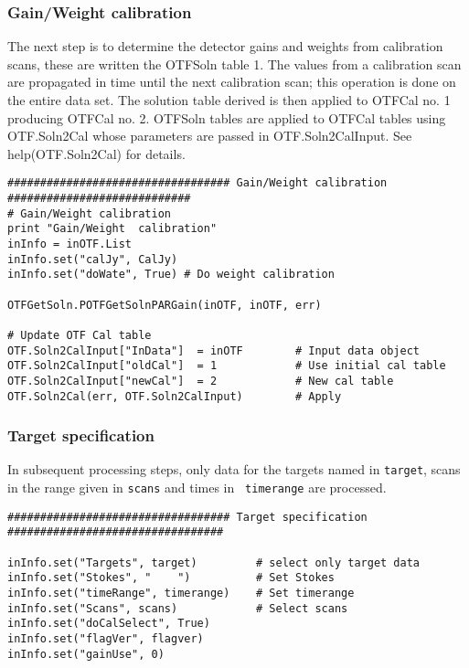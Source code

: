 \documentclass[11pt]{report}
\begin{document}
\subsubsection{Gain/Weight calibration}
The next step is to determine the detector gains and weights from
calibration scans, these are written the OTFSoln table 1.
The values from a calibration scan are propagated in time until the
next calibration scan;  this operation is done on the entire data set.
The solution table derived is then applied to OTFCal no. 1 producing
OTFCal no. 2.
OTFSoln tables are applied to OTFCal tables using OTF.Soln2Cal whose
parameters are passed in OTF.Soln2CalInput.
See help(OTF.Soln2Cal) for details.
\begin{verbatim}
################################## Gain/Weight calibration ############################
# Gain/Weight calibration
print "Gain/Weight  calibration"
inInfo = inOTF.List
inInfo.set("calJy", CalJy)
inInfo.set("doWate", True) # Do weight calibration

OTFGetSoln.POTFGetSolnPARGain(inOTF, inOTF, err)

# Update OTF Cal table
OTF.Soln2CalInput["InData"]  = inOTF        # Input data object
OTF.Soln2CalInput["oldCal"]  = 1            # Use initial cal table
OTF.Soln2CalInput["newCal"]  = 2            # New cal table
OTF.Soln2Cal(err, OTF.Soln2CalInput)        # Apply
\end{verbatim}

\subsubsection{Target specification}
In subsequent processing steps, only data for the targets named in
{\tt target}, scans in the range given in {\tt scans} and times in {\tt
timerange} are processed.
\begin{verbatim}
################################## Target specification #################################

inInfo.set("Targets", target)         # select only target data
inInfo.set("Stokes", "    ")          # Set Stokes
inInfo.set("timeRange", timerange)    # Set timerange
inInfo.set("Scans", scans)            # Select scans
inInfo.set("doCalSelect", True)       
inInfo.set("flagVer", flagver)
inInfo.set("gainUse", 0)

\end{verbatim}
\end{document}
